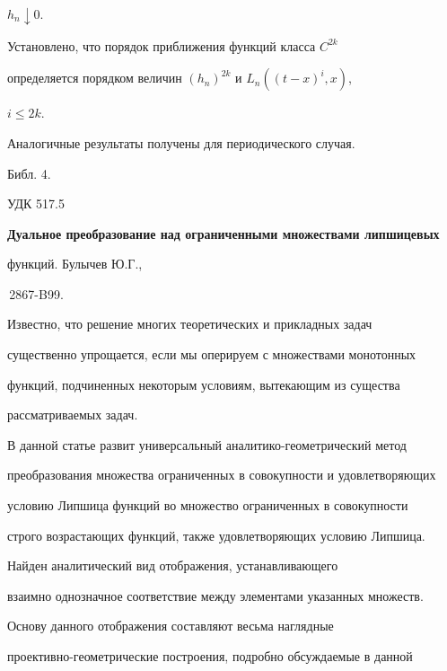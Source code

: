 $h_n\downarrow0$. 


 


Установлено, что порядок приближения функций класса $C^{2k}$ 


определяется порядком величин $(h_n)^{2k}$ и $L_n((t-x)^i,x)$, 


$i\le2k$. 


 


Аналогичные результаты получены для периодического случая. 


Библ. 4. 


\bigskip 


 


 


{\hfill {УДК 517.5}} 


 


{\bf Дуальное преобразование над ограниченными множествами липшицевых 


функций. Булычев Ю.Г.,  


\No\,2867-B99.} 


\medskip 


 


Известно, что решение многих теоретических и прикладных задач 


существенно упрощается, если мы оперируем с множествами монотонных 


функций, подчиненных некоторым условиям, вытекающим из существа 


рассматриваемых задач. 


 


В данной статье развит универсальный аналитико-геометрический метод 


преобразования множества ограниченных в совокупности и удовлетворяющих 


условию Липшица функций во множество ограниченных в совокупности 


строго возрастающих функций, также удовлетворяющих условию Липшица. 


Найден аналитический вид отображения, устанавливающего 


взаимно однозначное соответствие между элементами указанных множеств. 


Основу данного отображения составляют весьма наглядные 


проективно-геометрические построения, подробно обсуждаемые в данной 



